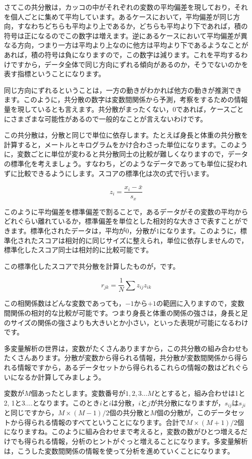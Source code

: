 \documentclass{ltjsbook}
\begin{document}
さてこの共分散は，カッコの中がそれぞれの変数の平均偏差を現しており，それを個人ごとに集めて平均しています。あるケースにおいて，平均偏差が同じ方向，すなわちどちらも平均より上であるか，どちらも平均より下であれば，積の符号は正になるのでこの数字は増えます。逆にあるケースにおいて平均偏差が異なる方向，つまり一方は平均より上なのに他方は平均より下であるようなことがあれば，積の符号は負になりますので，この数字は減ります。これを平均するわけですから，データ全体で同じ方向にずれる傾向があるのか，そうでないのかを表す指標ということになります。

同じ方向にずれるということは，一方の動きがわかれば他方の動きが推測できます。このように，共分散の数字は変数間関係から予測，考察をするための情報量を現しているとも言えます。共分散がまったくない，0であれば，ケースごとにさまざまな可能性があるので一般的なことが言えないわけです。

この共分散は，分散と同じで単位に依存します。たとえば身長と体重の共分散を計算すると，メートルとキログラムをかけ合わさった単位になります。このように，変数ごとに単位が変わると共分散同士の比較が難しくなりますので，データの標準化を考えましょう。すなわち，どのようなデータであっても単位に捉われずに比較できるようにします。スコアの標準化は次の式で行います。

\[ z_i = \frac{x_i - \bar{x}}{s_x} \]

このように平均偏差を標準偏差で割ることで，あるデータがその変数の平均からどれぐらい離れているか，標準偏差を単位とした相対的な大きさで表すことができます。標準化されたデータは，平均が$0$，分散が$1$になります。このように，標準化されたスコアは相対的に同じサイズに整えられ，単位に依存しませんので，標準化したスコア同士は相対的に比較可能です。

この標準化したスコアで共分散を計算したものが，です。

\[ r_{jk} = \frac{1}{N} \sum z_{ij} z_{ik} \]

この相関係数はどんな変数であっても，$-1$から$+1$の範囲に入りますので，変数間関係の相対的な比較が可能です。つまり身長と体重の関係の強さは，身長と足のサイズの関係の強さよりも大きいとか小さい，といった表現が可能になるわけです。

多変量解析の世界は，変数がたくさんありますから，この共分散の組み合わせもたくさんあります。分散が変数から得られる情報，共分散が変数間関係から得られる情報ですから，あるデータセットから得られるこれらの情報の数はどれぐらいになるか計算してみましょう。

変数が$M$個あったとします。変数番号が$1,2,3...M$ととすると，組み合わせは1と2, 1と3....となります。このとき$i$と$i$は分散，$i$と$j$が共分散になりますが，$s_{ij}$は$s_{ji}$と同じですから，$M \times (M-1) /2$個の共分散と$M$個の分散が，このデータセットから得られる情報のすべてということになります。合計で$M \times (M+1) /2 $個になりますね。このように組み合わせまで考えると，変数の数がひとつ増えるだけでも得られる情報，分析のヒントがぐっと増えることになります。多変量解析は，こうした変数間関係の情報を使って分析を進めていくことになります。
\end{document}
